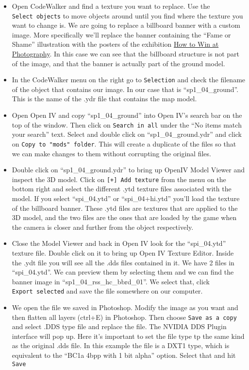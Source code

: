 \documentclass[
  openany]{book}
\begin{document}
\begin{itemize}
\item
  Open CodeWalker and find a texture you want to replace. Use the \texttt{Select\ objects} to move objects around until you find where the texture you want to change is. We are going to replace a billboard banner with a custom image. More specifically we'll replace the banner containing the ``Fame or Shame'' illustration with the posters of the exhibition \href{https://www.howtowinat.photography/}{How to Win at Photography}. In this case we can see that the billboard structure is not part of the image, and that the banner is actually part of the ground model.
\item
  In the CodeWalker menu on the right go to \texttt{Selection} and check the filename of the object that contains our image. In our case that is ``sp1\_04\_ground''. This is the name of the .ydr file that contains the map model.
\item
  Open Open IV and copy ``sp1\_04\_ground'' into Open IV's search bar on the top of the window. Then click on \texttt{Search\ in\ all} under the ``No items match your search'' text. Select and double click on ``sp1\_04\_ground.ydr'' and click on \texttt{Copy\ to\ "mods"\ folder}. This will create a duplicate of the files so that we can make changes to them without corrupting the original files.
\item
  Double click on ``sp1\_04\_ground.ydr'' to bring up OpenIV Model Viewer and inspect the 3D model. Click on \texttt{{[}+{]}\ Add\ texture} from the menu on the bottom right and select the different .ytd texture files associated with the model. If you select ``spi\_04.ytd'' or ``spi\_04+hi.ytd'' you'll load the texture of the billboard banner. These .ytd files are textures that are applied to the 3D model, and the two files are the ones that are loaded by the game when the camera is closer and further from the object respectively.
\item
  Close the Model Viewer and back in Open IV look for the ``spi\_04.ytd'' texture file. Double click on it to bring up Open IV Texture Editor. Inside the .ydt file you will see all the .dds files contained in it. We have 2 files in ``spi\_04.ytd''. We can preview them by selecting them and we can find the banner image in ``sp1\_04\_rss\_hc\_bbrd\_01''. We select that, click \texttt{Export\ selected} and save the file somewhere on our computer.
\item
  We open the file we saved in Photoshop. Modify the image as you want and then flatten all layers (ctrl+E) in Photoshop. Then choose \texttt{Save\ as\ a\ copy} and select .DDS type file and replace the file. The NVIDIA DDS Plugin interface will pop up. Here it's important to set the file type tp the same kind as the original .dds file. In this example the file is a DXT1 type, which is equivalent to the ``BC1a 4bpp with 1 bit alpha'' option. Select that and hit \texttt{Save}

\end{itemize}
\end{document}
